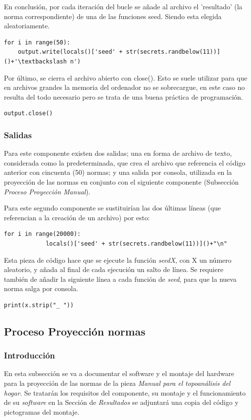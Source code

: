 \documentclass[12pt,twocolumn]{article}
\begin{document}
En conclusión, por cada iteración del bucle se añade al archivo el 'resultado'
(la norma correspondiente) de una de las funciones seed. Siendo esta elegida
aleatoriamente.
\begin{lstlisting}[texcl=true]
for i in range(50):
    output.write(locals()['seed' + str(secrets.randbelow(11))]()+'\textbackslash n')
\end{lstlisting}

Por último, se cierra el archivo abierto con close(). Esto se suele utilizar
para que en archivos grandes la memoria del ordenador no se sobrecargue, en este
caso no resulta del todo necesario pero se trata de una buena práctica de programación.
\begin{lstlisting}[texcl=true]
output.close()
\end{lstlisting}


	
	\subsubsection{Salidas}
	
	Para este componente existen dos salidas; una en forma de archivo de texto, considerada como la predeterminada, que crea el archivo que referencia el código anterior con cincuenta (50) normas; y una salida por consola, utilizada en la proyección de las normas en conjunto con el siguiente componente (Subsección \textit{Proceso Proyección Manual}).
	
	Para este segundo componente se sustituirían las dos últimas líneas (que referencian a la creación de un archivo) por esto:
	\begin{lstlisting}[texcl=true]
	for i in range(20000):
    		locals()['seed' + str(secrets.randbelow(11))]()+"\n"
\end{lstlisting}

Esta pieza de código hace que se ejecute la función \textit{seedX}, con X un número aleatorio, y añada al final de cada ejecución un salto de línea. Se requiere también de añadir la siguiente línea a cada función de \textit{seed}, para que la nueva norma salga por consola.
\begin{lstlisting}[texcl=true]
print(x.strip("_ "))
\end{lstlisting}  	
\newpage
	\subsection{Proceso Proyección normas}
	
	\subsubsection{Introducción}
	En esta subsección se va a documentar el software y el montaje del hardware para la proyección de las normas de la pieza \textit{Manual para el topoanálisis del hogar}. Se tratarán los requisitos del componente, su montaje y el funcionamiento de su \textit{software} en la Sección de \textit{Resultados} se adjuntará una copia del código y pictogramas del montaje.
	
\end{document}
